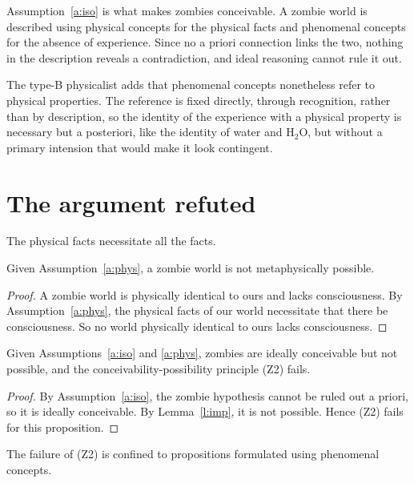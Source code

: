 \documentclass{situationist-preprint}
\begin{document}
Assumption~\ref{a:iso} is what makes zombies conceivable. A zombie world is described using physical concepts for the physical facts and phenomenal concepts for the absence of experience. Since no a priori connection links the two, nothing in the description reveals a contradiction, and ideal reasoning cannot rule it out.

The type-B physicalist adds that phenomenal concepts nonetheless refer to physical properties. The reference is fixed directly, through recognition, rather than by description, so the identity of the experience with a physical property is necessary but a posteriori, like the identity of water and H$_2$O, but without a primary intension that would make it look contingent.

\section{The argument refuted}

\begin{assumption}[Physicalism]\label{a:phys}
The physical facts necessitate all the facts.
\end{assumption}

\begin{lemma}\label{l:imp}
Given Assumption~\ref{a:phys}, a zombie world is not metaphysically possible.
\end{lemma}

\begin{proof}
A zombie world is physically identical to ours and lacks consciousness. By Assumption~\ref{a:phys}, the physical facts of our world necessitate that there be consciousness. So no world physically identical to ours lacks consciousness.
\end{proof}

\begin{theorem}\label{t:main}
Given Assumptions~\ref{a:iso} and \ref{a:phys}, zombies are ideally conceivable but not possible, and the conceivability-possibility principle (Z2) fails.
\end{theorem}

\begin{proof}
By Assumption~\ref{a:iso}, the zombie hypothesis cannot be ruled out a priori, so it is ideally conceivable. By Lemma~\ref{l:imp}, it is not possible. Hence (Z2) fails for this proposition.
\end{proof}

\begin{corollary}\label{c:scope}
The failure of (Z2) is confined to propositions formulated using phenomenal concepts.
\end{corollary}
\end{document}
